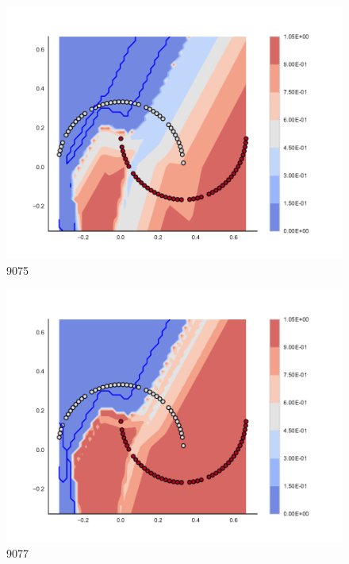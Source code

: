 \begin{subfigure}[b]{0.09\textwidth}
    \includegraphics[clip, trim=2.35cm 1.75cm 4.5cm 0cm,width=\textwidth]{img/convergence/9075.pdf}
    \caption{9075}
    \label{fig:convergence_9075}
\end{subfigure}
%
\begin{subfigure}[b]{0.09\textwidth}
    \includegraphics[clip, trim=2.35cm 1.75cm 4.5cm 0cm,width=\textwidth]{img/convergence/9077.pdf}
    \caption{9077}
    \label{fig:convergence_9077}
\end{subfigure}
%
